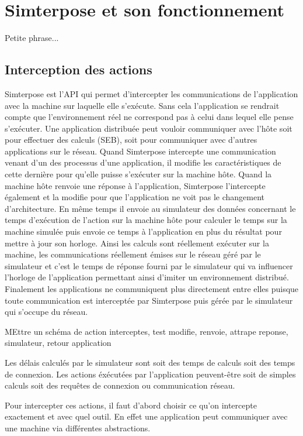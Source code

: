 \section{Simterpose et son fonctionnement}
Petite phrase...
\subsection{Interception des actions}
Simterpose est l'API qui permet d'intercepter les communications de
l'application avec la machine sur laquelle elle s'exécute. Sans cela
l'application se rendrait compte que l'environnement réel ne correspond pas à
celui dans lequel elle pense s'exécuter. Une application distribuée peut vouloir
communiquer avec l'hôte soit pour effectuer des calculs (SEB), soit pour
communiquer avec d'autres applications sur le réseau. Quand Simterpose
intercepte une communication venant d'un des processus d'une application, il modifie les
caractéristiques de cette dernière pour qu'elle puisse s'exécuter sur la machine
hôte. Quand la machine hôte renvoie une réponse à l'application, Simterpose
l'intercepte également et la modifie pour que l'application ne voit pas le
changement d'architecture. En même temps il envoie au simulateur des données
concernant le temps d'exécution de l'action sur la machine hôte pour calculer le
temps sur la machine simulée puis envoie ce temps à l'application en plus du
résultat pour mettre à jour son horloge. Ainsi les calculs sont réellement
exécuter sur la machine, les communications réellement émises sur le réseau géré
par le simulateur et c'est le temps de réponse fourni par le simulateur qui va
influencer l'horloge de l'application permettant ainsi d'imiter un environnement
distribué. Finalement les applications ne communiquent plus directement entre
elles puisque toute communication est interceptée par Simterpose puis gérée par
le simulateur qui s'occupe du réseau.

{\color{red} MEttre un schéma de action interceptes, test modifie, renvoie,
  attrape reponse, simulateur, retour application}

Les délais calculés par le simulateur sont soit des temps de calculs soit des
temps de connexion. Les actions éxécutées par l'application peuvent-être soit
de simples calculs soit des requêtes de connexion ou communication réseau.

Pour intercepter ces actions, il faut d'abord choisir ce qu'on intercepte
exactement et avec quel outil. En effet une application peut communiquer avec
une machine via différentes abstractions.

